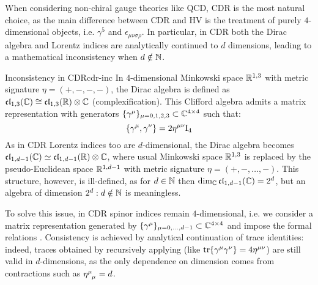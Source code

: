 When considering non-chiral gauge theories like QCD, CDR is the most natural choice, as the main difference between CDR and HV is the treatment of purely $ 4 $-dimensional objects, i.e. $ \gamma^5 $ and $ \epsilon_{\mu \nu \sigma \rho} $. In particular, in CDR both the Dirac algebra and Lorentz indices are analytically continued to $ d $ dimensions, leading to a mathematical inconsistency when $ d \notin \mathbb{N} $.

\begin{observation}{Inconsistency in CDR}{cdr-inc}
  In $ 4 $-dimensional Minkowski space $ \mathbb{R}^{1,3} $ with metric signature $ \eta = (+,-,-,-) $, the Dirac algebra is defined as $ \mathfrak{cl}_{1,3}(\mathbb{C}) \cong \mathfrak{cl}_{1,3}(\mathbb{R}) \otimes \mathbb{C} $ (complexification\footnotemark). This Clifford algebra admits a matrix representation with generators $ \{\gamma^\mu\}_{\mu = 0, 1, 2, 3} \subset \mathbb{C}^{4 \times 4} $ such that:
  \begin{equation}
    \{\gamma^\mu , \gamma^\nu\} = 2 \eta^{\mu \nu} \mathrm{I}_4
    \label{eq:dir-alg}
  \end{equation}
  As in CDR Lorentz indices too are $ d $-dimensional, the Dirac algebra becomes $ \mathfrak{cl}_{1,d-1}(\mathbb{C}) \simeq \mathfrak{cl}_{1,d-1}(\mathbb{R}) \otimes \mathbb{C} $, where usual Minkowski space $ \mathbb{R}^{1,3} $ is replaced by the pseudo-Euclidean space $ \mathbb{R}^{1,d-1} $ with metric signature $ \eta = (+,-,\dots,-) $. This structure, however, is ill-defined, as for $ d \in \mathbb{N} $ then $ \dim_{\mathbb{C}} \mathfrak{cl}_{1,d-1}(\mathbb{C}) = 2^d $, but an algebra of dimension $ 2^d : d \notin \mathbb{N} $ is meaningless.

  To solve this issue, in CDR spinor indices remain $ 4 $-dimensional, i.e. we consider a matrix representation generated by $ \{\gamma^\mu\}_{\mu = 0, \dots, d-1} \subset \mathbb{C}^{4 \times 4} $ and impose the formal relations . Consistency is achieved by analytical continuation of trace identities: indeed, traces obtained by recursively applying  (like $ \operatorname{tr}\{\gamma^\mu \gamma^\nu\} = 4 \eta^{\mu \nu} $) are still valid in $ d $-dimensions, as the only dependence on dimension comes from contractions such as $ \tensor{\eta}{^\mu_\mu} = d $.


\end{observation}
